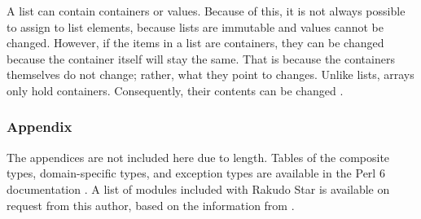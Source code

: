 \documentclass[14pt,english]{extarticle}
\begin{document}
A list can contain containers or values. Because of this, it is not
always possible to assign to list elements, because lists are immutable
and values cannot be changed. However, if the items in a list are
containers, they can be changed because the container itself will
stay the same. That is because the containers themselves do not change;
rather, what they point to changes. Unlike lists, arrays only hold
containers. Consequently, their contents can be changed \cite{Documentation}.

\newpage{}
\nocite{*}




\subsubsection*{Appendix}

The appendices are not included here due to length. Tables of the
composite types, domain-specific types, and exception types are available
in the Perl 6 documentation \cite{Documentation}. A list of modules
included with Rakudo Star is available on request from this author,
based on the information from \cite{New1}.
\end{document}
